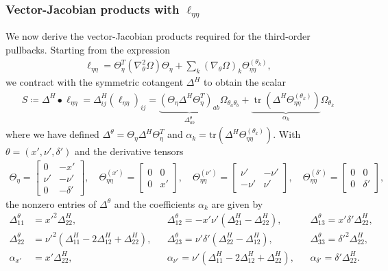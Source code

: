 \documentclass{article}
\begin{document}
\subsubsection{Vector-Jacobian products with $\ell_{\eta\eta}$}

We now derive the vector-Jacobian products required for the third-order pullbacks.
Starting from the expression
%
\begin{align}
  \ell_{\eta\eta} = \Theta_\eta^T (\nabla_\theta^2 \Omega) \Theta_\eta + \sum_{k} (\nabla_\theta \Omega)_k \Theta_{\eta\eta}^{(\theta_k)},
\end{align}
%
we contract with the symmetric cotangent $\Delta^H$ to obtain the scalar
%
\begin{align}
  S \coloneqq \Delta^H \bullet \ell_{\eta\eta}
  = \Delta^H_{ij} (\ell_{\eta\eta})_{ij}
  = \underbrace{(\Theta_\eta \Delta^H \Theta_\eta^T)_{ab}}_{\Delta^\theta_{ab}} \Omega_{\theta_a \theta_b}
  + \underbrace{\operatorname{tr}(\Delta^H \Theta_{\eta\eta}^{(\theta_k)})}_{\alpha_k} \Omega_{\theta_k}
\end{align}
%
where we have defined $\Delta^\theta = \Theta_\eta \Delta^H \Theta_\eta^T$ and $\alpha_k = \mathrm{tr}(\Delta^H \Theta_{\eta\eta}^{(\theta_k)})$.
With $\theta = (x', \nu', \delta')$ and the derivative tensors
%
\begin{align}
  \Theta_\eta = \begin{bmatrix} 0 & -x' \\ \nu' & -\nu' \\ 0 & -\delta' \end{bmatrix},
  \quad
  \Theta_{\eta\eta}^{(x')} = \begin{bmatrix} 0 & 0 \\ 0 & x' \end{bmatrix},
  \quad
  \Theta_{\eta\eta}^{(\nu')} = \begin{bmatrix} \nu' & -\nu' \\ -\nu' & \nu' \end{bmatrix},
  \quad
  \Theta_{\eta\eta}^{(\delta')} = \begin{bmatrix} 0 & 0 \\ 0 & \delta' \end{bmatrix},
\end{align}
%
the nonzero entries of $\Delta^\theta$ and the coefficients $\alpha_k$ are given by
%
\begin{align}
  \Delta^{\theta}_{11} & = x'^2 \Delta^H_{22},                                      &  & \Delta^{\theta}_{12} = -x' \nu' (\Delta^H_{21} - \Delta^H_{22}),       &  & \Delta^{\theta}_{13} = x' \delta' \Delta^H_{22}, \\
  \Delta^{\theta}_{22} & = \nu'^2 (\Delta^H_{11} - 2\Delta^H_{12} + \Delta^H_{22}), &  & \Delta^{\theta}_{23} = \nu' \delta' (\Delta^H_{22} - \Delta^H_{12}),   &  & \Delta^{\theta}_{33} = \delta'^2 \Delta^H_{22},  \\
  \alpha_{x'}          & = x' \Delta^H_{22},                                        &  & \alpha_{\nu'} = \nu' (\Delta^H_{11} - 2\Delta^H_{12} + \Delta^H_{22}), &  & \alpha_{\delta'} = \delta' \Delta^H_{22}.
\end{align}
\end{document}
